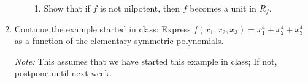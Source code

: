 \documentclass[11pt]{report}
\newcommand\Rf{R_f}
\begin{document}
\begin{enumerate}
\begin{enumerate}
\begin{enumerate}
\item Show that if $f$ is not nilpotent, then $f$ becomes a unit in $\Rf$.

\end{enumerate}

\end{enumerate}

\item Continue the example started in class: 
        Express $f(x_1,x_2,x_3) = x_1^4 + x_2^4 + x_3^4$ as a function
        of the elementary symmetric polynomials. 
        
        \emph{Note:} This assumes that we
        have started this example in class;  If not, postpone until next week.
        

\end{enumerate}
\end{document}
